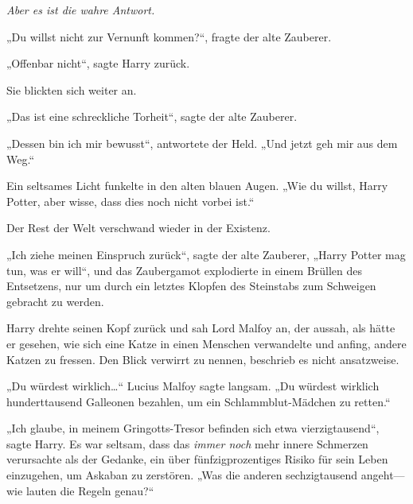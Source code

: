 \emph{Aber es ist die wahre Antwort.}

„Du willst nicht zur Vernunft kommen?“, fragte der alte Zauberer.

„Offenbar nicht“, sagte Harry zurück.

Sie blickten sich weiter an.

„Das ist eine schreckliche Torheit“, sagte der alte Zauberer.

„Dessen bin ich mir bewusst“, antwortete der Held. „Und jetzt geh mir aus dem Weg.“

Ein seltsames Licht funkelte in den alten blauen Augen.
„Wie du willst, Harry Potter, aber wisse, dass dies noch nicht vorbei ist.“

Der Rest der Welt verschwand wieder in der Existenz.

„Ich ziehe meinen Einspruch zurück“, sagte der alte Zauberer, „Harry Potter mag tun, was er will“, und das Zaubergamot explodierte in einem Brüllen des Entsetzens, nur um durch ein letztes Klopfen des Steinstabs zum Schweigen gebracht zu werden.

Harry drehte seinen Kopf zurück und sah Lord Malfoy an, der aussah, als hätte er gesehen, wie sich eine Katze in einen Menschen verwandelte und anfing, andere Katzen zu fressen. Den Blick verwirrt zu nennen, beschrieb es nicht ansatzweise.

„Du würdest wirklich…“ Lucius Malfoy sagte langsam. „Du würdest wirklich hunderttausend Galleonen bezahlen, um ein Schlammblut-Mädchen zu retten.“

„Ich glaube, in meinem Gringotts-Tresor befinden sich etwa vierzigtausend“, sagte Harry. Es war seltsam, dass das \emph{immer noch} mehr innere Schmerzen verursachte als der Gedanke, ein über fünfzigprozentiges Risiko für sein Leben einzugehen, um Askaban zu zerstören. „Was die anderen sechzigtausend angeht—wie lauten die Regeln genau?“

